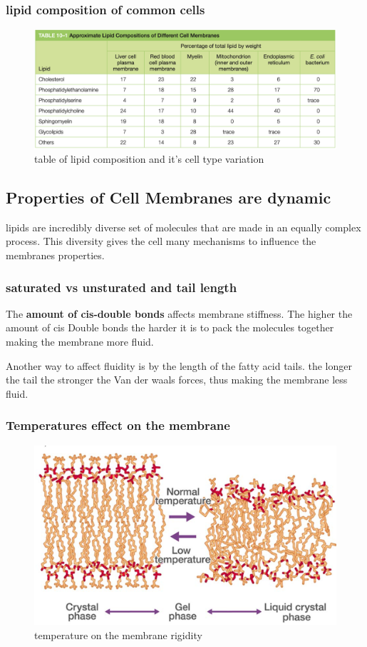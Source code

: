 \documentclass[../main.tex]{subfiles}
\begin{document}
        \subsubsection{lipid composition of common cells}
        \begin{figure}[H]
            \centering
            \includegraphics[width=\linewidth]{table.png}
            \caption{table of lipid composition and it's cell type variation}
            \label{fig:lipidComposition}
        \end{figure}
        
        

            

    

    \subsection{Properties of Cell Membranes are dynamic}
        lipids are incredibly diverse set of molecules that are made in an equally complex process. This diversity gives the cell many mechanisms to influence the membranes properties.
        
        \subsubsection{saturated vs unsturated and tail length}
        The \textbf{amount of cis-double bonds} affects membrane stiffness. The higher the amount of cis Double bonds the harder it is to pack the molecules together making the membrane more fluid. 
        \par
        Another way to affect fluidity is by the length of the fatty acid tails. the longer the tail the stronger the Van der waals forces, thus making the membrane less fluid.


        \subsubsection{Temperatures effect on the membrane}
        \begin{figure}[H]
            \centering
            \includegraphics[width=0.4\linewidth]{temp.png}
            \caption{temperature on the membrane rigidity}
            \label{fig:enter-label}
        \end{figure}
\end{document}
